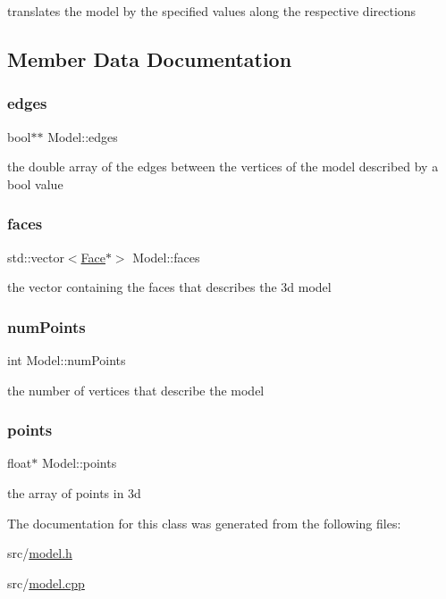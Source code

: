 translates the model by the specified values along the respective directions 



\subsection{Member Data Documentation}
\mbox{\label{class_model_a723a0c631c2ff688fed06c5652879ef7}} 
\subsubsection{\texorpdfstring{edges}{edges}}
{\footnotesize\ttfamily bool$\ast$$\ast$ Model\+::edges}



the double array of the edges between the vertices of the model described by a bool value 

\mbox{\label{class_model_a7752ae8e1bbacc53ed94d7bd9c404b6d}} 
\subsubsection{\texorpdfstring{faces}{faces}}
{\footnotesize\ttfamily std\+::vector$<$\mbox{\hyperlink{class_face}{Face}}$\ast$$>$ Model\+::faces}



the vector containing the faces that describes the 3d model 

\mbox{\label{class_model_a39ac6e91375d5ac5799a9845c3479d9c}} 
\subsubsection{\texorpdfstring{num\+Points}{numPoints}}
{\footnotesize\ttfamily int Model\+::num\+Points}



the number of vertices that describe the model 

\mbox{\label{class_model_a6436acbcf42bece5621666fe37c71309}} 
\subsubsection{\texorpdfstring{points}{points}}
{\footnotesize\ttfamily float$\ast$ Model\+::points}



the array of points in 3d 



The documentation for this class was generated from the following files\+:\begin{DoxyCompactItemize}
\item 
src/\mbox{\hyperlink{model_8h}{model.\+h}}\item 
src/\mbox{\hyperlink{model_8cpp}{model.\+cpp}}\end{DoxyCompactItemize}
